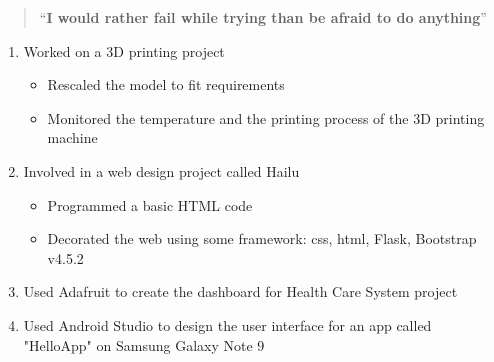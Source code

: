 
\begin{quote}
``\footnotesize \textbf{I would rather fail while trying than be afraid to do anything}''
\end{quote}



\begin{enumerate}

\item \footnotesize Worked on a 3D printing project
     \begin{itemize}

     \item \footnotesize Rescaled the model to fit requirements 
     \item \footnotesize Monitored the temperature and the printing process of the 3D printing machine
     \end{itemize}
\item \footnotesize Involved in a web design project called Hailu
    \begin{itemize}
        \item \footnotesize Programmed a basic HTML code
        \item \footnotesize Decorated the web using some framework: css, html, Flask, Bootstrap v4.5.2
    \end{itemize}
\item \footnotesize Used Adafruit to create the dashboard for Health Care System project
\item \footnotesize Used Android Studio to design the user interface for an app called "HelloApp" on Samsung Galaxy Note 9


\end{enumerate}

\medskip

\divider
{}
\divider
{}
\divider
{}


\divider
{}
\divider
{}
\divider
{}


\medskip


